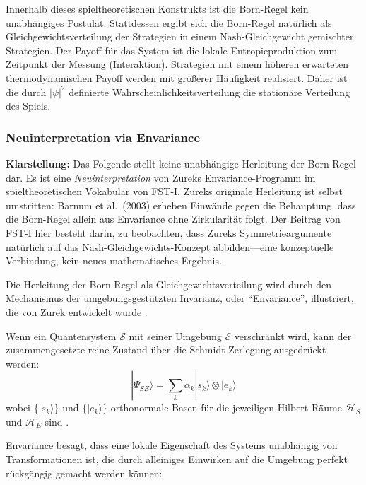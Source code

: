\documentclass[12pt,a4paper]{article}
\theoremstyle{remark}
\begin{document}
Innerhalb dieses spieltheoretischen Konstrukts ist die Born-Regel kein unabh\"angiges Postulat. Stattdessen ergibt sich die Born-Regel nat\"urlich als Gleichgewichtsverteilung der Strategien in einem Nash-Gleichgewicht gemischter Strategien. Der Payoff f\"ur das System ist die lokale Entropieproduktion zum Zeitpunkt der Messung (Interaktion). Strategien mit einem h\"oheren erwarteten thermodynamischen Payoff werden mit gr\"o\ss{}erer H\"aufigkeit realisiert. Daher ist die durch $|\psi|^2$ definierte Wahrscheinlichkeitsverteilung die station\"are Verteilung des Spiels.

\subsubsection{Neuinterpretation via Envariance}

\textbf{Klarstellung:} Das Folgende stellt keine unabh\"angige Herleitung der Born-Regel dar. Es ist eine \emph{Neuinterpretation} von Zureks Envariance-Programm \citep{Zurek2003,Zurek2005} im spieltheoretischen Vokabular von FST-I. Zureks originale Herleitung ist selbst umstritten: Barnum et al.\ (2003) \citep{ZurekDerivation2003} erheben Einw\"ande gegen die Behauptung, dass die Born-Regel allein aus Envariance ohne Zirkularit\"at folgt. Der Beitrag von FST-I hier besteht darin, zu beobachten, dass Zureks Symmetrieargumente nat\"urlich auf das Nash-Gleichgewichts-Konzept abbilden---eine konzeptuelle Verbindung, kein neues mathematisches Ergebnis.

Die Herleitung der Born-Regel als Gleichgewichtsverteilung wird durch den Mechanismus der umgebungsgest\"utzten Invarianz, oder ``Envariance'', illustriert, die von Zurek entwickelt wurde \citep{Zurek2003,Zurek2005}.

Wenn ein Quantensystem $\mathcal{S}$ mit seiner Umgebung $\mathcal{E}$ verschr\"ankt wird, kann der zusammengesetzte reine Zustand \"uber die Schmidt-Zerlegung ausgedr\"uckt werden:
\begin{equation}
|\Psi_{SE}\rangle = \sum_k \alpha_k |s_k\rangle \otimes |e_k\rangle
\end{equation}
wobei $\{|s_k\rangle\}$ und $\{|e_k\rangle\}$ orthonormale Basen f\"ur die jeweiligen Hilbert-R\"aume $\mathcal{H}_S$ und $\mathcal{H}_E$ sind \citep{ZurekDerivation2003}.

Envariance besagt, dass eine lokale Eigenschaft des Systems unabh\"angig von Transformationen ist, die durch alleiniges Einwirken auf die Umgebung perfekt r\"uckg\"angig gemacht werden k\"onnen:
\end{document}

